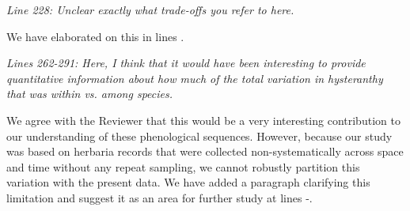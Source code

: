 \documentclass{article}[12pt]
\begin{document}
\emph{Line 228: Unclear exactly what trade-offs you refer to here.}

We have elaborated on this in lines .

\emph{Lines 262-291: Here, I think that it would have been interesting to provide quantitative information about how much of the total variation in hysteranthy that was within vs. among species.}

We agree with the Reviewer that this would be a very interesting contribution to our understanding of these phenological sequences. However, because our study was based on herbaria records that were collected non-systematically across space and time without any repeat sampling, we cannot robustly partition this variation with the present data. We have added a paragraph clarifying this limitation and suggest it as an area for further study at lines -.  

 
\end{document}

